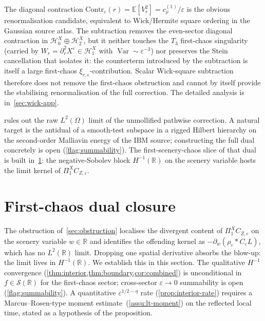 \documentclass[EJP]{ejpecp}
\newcommand{\R}{\mathbb{R}}
\renewcommand{\E}{\mathbb{E}}
\newcommand{\Hilb}{\mathcal{H}}
\newcommand{\IBM}{Z}
\newcommand{\Pir}{\Pi}
\DeclareMathOperator{\Var}{Var}
\begin{document}
\begin{remark}
\label{rem:wick-not-sufficient}
The diagonal contraction
$\mathrm{Contr}_\varepsilon(r)=\E[V_r^{2}]=c_\rho^{(1)}/\varepsilon$
is the obvious renormalisation candidate, equivalent to Wick/Hermite
square ordering in the Gaussian source atlas. The subtraction
removes the even-sector diagonal contraction in $\Hilb_0^X\oplus\Hilb_2^X$,
but it neither touches the $T_3$ first-chaos singularity (carried
by $W_r=\partial_r^{2}X^\varepsilon\in\Hilb_1^X$ with
$\Var\sim\varepsilon^{-3}$) nor preserves the Stein cancellation
that isolates it: the counterterm introduced by the subtraction is
itself a large first-chaos $\xi_{r,\varepsilon}$-contribution.
Scalar Wick-square subtraction therefore does not remove the
first-chaos obstruction and cannot by itself provide the
stabilising renormalisation of the full correction. The detailed
analysis is in~\cref{sec:wick-app}.
\end{remark}

 rules out the raw $L^{2}(\Omega)$ limit
of the unmollified pathwise correction. A natural target is the
antidual of a smooth-test subspace in a rigged Hilbert hierarchy on
the second-order Malliavin energy of the IBM source; constructing
the full dual concretely is open (\cref{flag:summability}). The
first-scenery-chaos slice of that dual is built in~\cref{sec:dual}:
the negative-Sobolev block $H^{-1}(\R)$ on the scenery variable
hosts the limit kernel of $\Pir_1^X C_{\IBM,\varepsilon}$.

\section{First-chaos dual closure}\label{sec:dual}

The obstruction of~\cref{sec:obstruction} localises the divergent
content of $\Pir_1^{X}C_{\IBM,\varepsilon}$ on the scenery variable
$w\in\R$ and identifies the offending kernel as
$-\partial_w(\rho_\varepsilon*C_\varepsilon L)$, which has no
$L^{2}(\R)$ limit. Dropping one spatial derivative absorbs the
blow-up: the limit lives in $H^{-1}(\R)$. We establish this in this
section. The qualitative $H^{-1}$ convergence
(\cref{thm:interior,thm:boundary,cor:combined}) is unconditional in
$f\in\mathscr S(\R)$ for the first-chaos sector; cross-sector
$\varepsilon\to 0$ summability is open (\cref{flag:summability}).
A quantitative $\varepsilon^{1/2-\eta}$ rate
(\cref{prop:interior-rate}) requires a Marcus--Rosen-type moment
estimate~(\cref{assu:lt-moment}) on the reflected local time, stated
as a hypothesis of the proposition.
\end{document}
